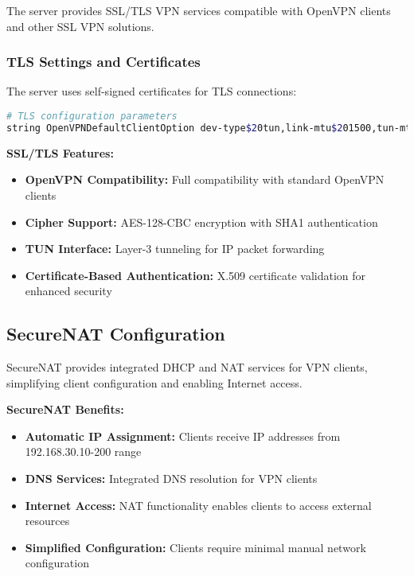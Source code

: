 The server provides SSL/TLS VPN services compatible with OpenVPN clients and other SSL VPN solutions.

\subsubsection{TLS Settings and Certificates}

The server uses self-signed certificates for TLS connections:

\begin{lstlisting}[language=bash]
# TLS configuration parameters
string OpenVPNDefaultClientOption dev-type$20tun,link-mtu$201500,tun-mtu$201500,cipher$20AES-128-CBC,auth$20SHA1,keysize$20128,key-method$202,tls-client
\end{lstlisting}

\textbf{SSL/TLS Features:}

\begin{itemize}
    \item \textbf{OpenVPN Compatibility:} Full compatibility with standard OpenVPN clients
    \item \textbf{Cipher Support:} AES-128-CBC encryption with SHA1 authentication
    \item \textbf{TUN Interface:} Layer-3 tunneling for IP packet forwarding
    \item \textbf{Certificate-Based Authentication:} X.509 certificate validation for enhanced security
\end{itemize}

\subsection{SecureNAT Configuration}

SecureNAT provides integrated DHCP and NAT services for VPN clients, simplifying client configuration and enabling Internet access.

\textbf{SecureNAT Benefits:}

\begin{itemize}
    \item \textbf{Automatic IP Assignment:} Clients receive IP addresses from 192.168.30.10-200 range
    \item \textbf{DNS Services:} Integrated DNS resolution for VPN clients
    \item \textbf{Internet Access:} NAT functionality enables clients to access external resources
    \item \textbf{Simplified Configuration:} Clients require minimal manual network configuration
\end{itemize}

